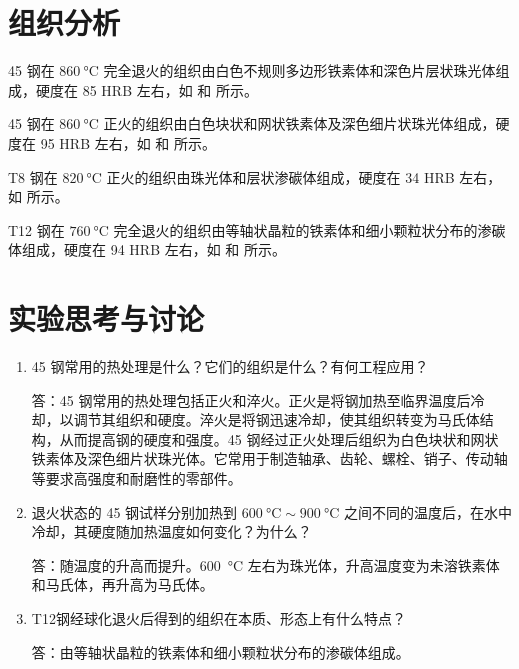 \documentclass[a4paper,utf8]{article}
\begin{document}
\section{组织分析}
45 钢在 $\SI{860}{\degreeCelsius}$ 完全退火的组织由白色不规则多边形铁素体和深色片层状珠光体组成，硬度在 85 HRB 左右，如 和 所示。\par
45 钢在 $\SI{860}{\degreeCelsius}$ 正火的组织由白色块状和网状铁素体及深色细片状珠光体组成，硬度在 95 HRB 左右，如 和 所示。\par
T8 钢在 $\SI{820}{\degreeCelsius}$ 正火的组织由珠光体和层状渗碳体组成，硬度在 34 HRB 左右，如 所示。\par
T12 钢在 $\SI{760}{\degreeCelsius}$ 完全退火的组织由等轴状晶粒的铁素体和细小颗粒状分布的渗碳体组成，硬度在 94 HRB 左右，如 和 所示。\par
\section{实验思考与讨论}
\begin{enumerate}
    \item 45 钢常用的热处理是什么？它们的组织是什么？有何工程应用？\par
    答：45 钢常用的热处理包括正火和淬火。正火是将钢加热至临界温度后冷却，以调节其组织和硬度。淬火是将钢迅速冷却，使其组织转变为马氏体结构，从而提高钢的硬度和强度。45 钢经过正火处理后组织为白色块状和网状铁素体及深色细片状珠光体。它常用于制造轴承、齿轮、螺栓、销子、传动轴等要求高强度和耐磨性的零部件。
    \item 退火状态的 45 钢试样分别加热到 $\SI{600}{\degreeCelsius} \sim \SI{900}{\degreeCelsius}$ 之间不同的温度后，在水中冷却，其硬度随加热温度如何变化？为什么？\par
    答：随温度的升高而提升。\SI{600}{\degreeCelsius} 左右为珠光体，升高温度变为未溶铁素体和马氏体，再升高为马氏体。
    \item T12钢经球化退火后得到的组织在本质、形态上有什么特点？\par
    答：由等轴状晶粒的铁素体和细小颗粒状分布的渗碳体组成。
\end{enumerate}
\end{document}
